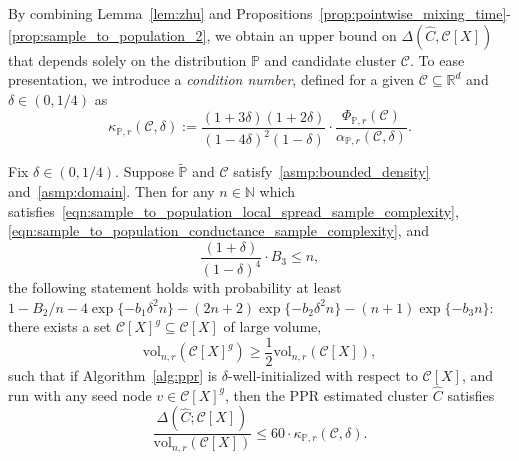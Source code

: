 \documentclass[11pt,twoside]{article}
\newcommand{\Reals}{\mathbb{R}}
\newcommand{\1}{\mathbf{1}}
\newcommand{\Rd}{\Reals^d}
\newcommand{\mc}[1]{\mathcal{#1}}
\newcommand{\mbb}[1]{\mathbb{#1}}
\newcommand{\Pbb}{\mathbb{P}}
\newcommand{\wt}[1]{\widetilde{#1}}
\newcommand{\wh}[1]{\widehat{#1}}
\newcommand{\vol}{\mathrm{vol}}
\begin{document}
By combining Lemma~\ref{lem:zhu} and Propositions~\ref{prop:pointwise_mixing_time}-\ref{prop:sample_to_population_2}, we obtain an upper bound on $\Delta(\wh{C},\mc{C}[X])$ that depends solely on the distribution $\Pbb$ and candidate cluster $\mc{C}$. To ease presentation, we introduce a \emph{condition number}, defined for a given $\mc{C} \subseteq \Rd$ and $\delta \in (0,1/4)$ as
\begin{equation}
\label{eqn:condition_number}
\kappa_{\Pbb,r}(\mc{C},\delta) := \frac{(1 + 3\delta)(1+2\delta)}{(1 - 4\delta)^2(1 - \delta)} \cdot \frac{\Phi_{\Pbb,r}(\mc{C})}{\alpha_{\Pbb,r}(\mc{C},\delta)}.
\end{equation}

\begin{theorem}
	\label{thm:volume_ssd_ub} 
	Fix $\delta \in (0,1/4)$. Suppose $\wt{\Pbb}$ and $\mc{C}$ satisfy~\ref{asmp:bounded_density} and~\ref{asmp:domain}. Then for any $n \in \mbb{N}$ which satisfies~\eqref{eqn:sample_to_population_local_spread_sample_complexity}, \eqref{eqn:sample_to_population_conductance_sample_complexity}, and
	\begin{equation}
	\label{eqn:volume_ssd_ub_sample_complexity}
	\frac{(1 + \delta)}{(1 - \delta)^4} \cdot B_3 \leq n,
	\end{equation} 
	the following statement holds with probability at least $1 - B_2/n - 4\exp\{-b_1\delta^2n\} - (2n + 2)\exp\{-b_2\delta^2n\} - (n + 1)\exp\{-b_3n\}$: there exists a set $\mc{C}[X]^g \subseteq \mc{C}[X]$ of large volume,
$$
\vol_{n,r}(\mc{C}[X]^g) \geq \frac{1}{2}\vol_{n,r}(\mc{C}[X]),
$$ 
such that if Algorithm~\ref{alg:ppr} is $\delta$-well-initialized with respect to $\mc{C}[X]$, and run with any seed node $v \in \mc{C}[X]^g$, then the PPR estimated cluster $\wh{C}$ satisfies
	\begin{equation}
	\label{eqn:volume_ssd_ub}
	\frac{\Delta(\wh{C};\mc{C}[X])}{\vol_{n,r}(\mc{C}[X])} \leq 60 \cdot \kappa_{\Pbb,r}(\mc{C},\delta).
	\end{equation}
\end{theorem}
\end{document}
